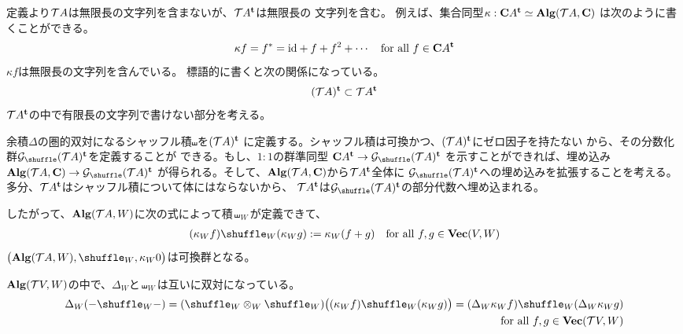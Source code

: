 	定義より${{\mathcal{T}}} A$は無限長の文字列を含まないが、${{\mathcal{T}}} A^{\mathbf{t}}$は無限長の
	文字列を含む。
	例えば、集合同型$\kappa:\mathbf{C} A^{\mathbf{t}}\simeq {\ensuremath{\mathbf{Alg}}}({{\mathcal{T}}} A,\mathbf{C})$
	は次のように書くことができる。
	\begin{equation*}\begin{split}
		\kappa f = f^* = {\operatorname{id}} + f + f^2 + \cdots
		\quad\text{for all }f\in \mathbf{C} A^{\mathbf{t}}
	\end{split}\end{equation*}
	$\kappa f$は無限長の文字列を含んでいる。
	標語的に書くと次の関係になっている。
	\begin{equation*}\begin{split}
		({{\mathcal{T}}} A)^{\mathbf{t}}\subset{\ensuremath{{\mathcal{T}}}} A^{\mathbf{t}}
	\end{split}\end{equation*}
	${{\mathcal{T}}} A^{\mathbf{t}}$の中で有限長の文字列で書けない部分を考える。

	\begin{todo}[アイデア]\label{todo:アイデア} %
		余積$\Delta$の圏的双対になるシャッフル積$\shuffle$を$({{\mathcal{T}}} A)^{\mathbf{t}}$
		に定義する。シャッフル積は可換かつ、$({{\mathcal{T}}} A)^{\mathbf{t}}$にゼロ因子を持たない
		から、その分数化群$\G_\shuffle(\T A)^\tran$を定義することが
		できる。もし、$1:1$の群準同型
		$\fukuso A^\tran\to\G_\shuffle(\T A)^\tran$
		を示すことができれば、埋め込み
		$\Alg(\T A,\fukuso)\to\G_\shuffle(\T A)^\tran$
		が得られる。そして、${\mathbf{Alg}}({{\mathcal{T}}} A,\mathbf{C})$から${{\mathcal{T}}} A^{\mathbf{t}}$全体に
		$\G_\shuffle(\T A)^\tran$への埋め込みを拡張することを考える。
		多分、${{\mathcal{T}}} A^{\mathbf{t}}$はシャッフル積について体にはならないから、
		${{\mathcal{T}}} A^{\mathbf{t}}$は$\G_\shuffle(\T A)^\tran$の部分代数へ埋め込まれる。
	\end{todo} %

	\begin{todo}[できるとは限らない]\label{todo:できるとは限らない} %
	したがって、${\mathbf{Alg}}({{\mathcal{T}}} A,W)$に次の式によって積$\shuffle_W$が定義できて、
	\begin{equation*}\begin{split}
		(\kappa_W f)\shuffle_W(\kappa_W g) := \kappa_W(f + g)
		\quad\text{for all }f,g\in \Vect(V,W)
	\end{split}\end{equation*}
	$\bigl(\Alg(\T A,W),\shuffle_W,\kappa_W0\bigr)$は可換群となる。
	\end{todo} %

	${\mathbf{Alg}}({{\mathcal{T}}} V,W)$の中で、$\Delta_W$と$\shuffle_W$は互いに双対になっている。
	\begin{equation*}\begin{split}
		\Delta_W(-\shuffle_W-) = (\shuffle_W\otimes_W\shuffle_W)
		\bigl((\kappa_Wf)\shuffle_W(\kappa_Wg)\bigr)
		= (\Delta_W\kappa_Wf)\shuffle_W(\Delta_W\kappa_Wg) \\
		\quad\text{for all }f,g\in \Vect(\T V,W)
	\end{split}\end{equation*}

